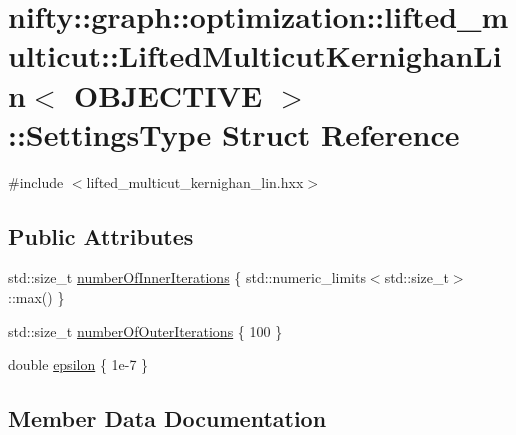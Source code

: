 \hypertarget{structnifty_1_1graph_1_1optimization_1_1lifted__multicut_1_1LiftedMulticutKernighanLin_1_1SettingsType}{}\section{nifty\+:\+:graph\+:\+:optimization\+:\+:lifted\+\_\+multicut\+:\+:Lifted\+Multicut\+Kernighan\+Lin$<$ O\+B\+J\+E\+C\+T\+I\+V\+E $>$\+:\+:Settings\+Type Struct Reference}
\label{structnifty_1_1graph_1_1optimization_1_1lifted__multicut_1_1LiftedMulticutKernighanLin_1_1SettingsType}


{\ttfamily \#include $<$lifted\+\_\+multicut\+\_\+kernighan\+\_\+lin.\+hxx$>$}

\subsection*{Public Attributes}
\begin{DoxyCompactItemize}
\item 
std\+::size\+\_\+t \hyperlink{structnifty_1_1graph_1_1optimization_1_1lifted__multicut_1_1LiftedMulticutKernighanLin_1_1SettingsType_a6f2cb4150df1691122aa530a44d92d8d}{number\+Of\+Inner\+Iterations} \{ std\+::numeric\+\_\+limits$<$std\+::size\+\_\+t$>$\+::max() \}
\item 
std\+::size\+\_\+t \hyperlink{structnifty_1_1graph_1_1optimization_1_1lifted__multicut_1_1LiftedMulticutKernighanLin_1_1SettingsType_aa028d408e916d4bba213e0427663d83d}{number\+Of\+Outer\+Iterations} \{ 100 \}
\item 
double \hyperlink{structnifty_1_1graph_1_1optimization_1_1lifted__multicut_1_1LiftedMulticutKernighanLin_1_1SettingsType_aa128febdb5173f112122a642901c9cc6}{epsilon} \{ 1e-\/7 \}
\end{DoxyCompactItemize}


\subsection{Member Data Documentation}
\hypertarget{structnifty_1_1graph_1_1optimization_1_1lifted__multicut_1_1LiftedMulticutKernighanLin_1_1SettingsType_aa128febdb5173f112122a642901c9cc6}{}
